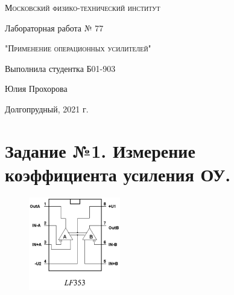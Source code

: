 \documentclass[a4paper]{article}
\begin{document}
\begin{titlepage}
	\centering
	\vspace{5cm}
	{\scshape\LARGE Московский физико-технический институт \par}
	\vspace{5cm}

	{\huge Лабораторная работа № 77 \par}
	\vspace{1cm}
	{\scshape\Large "Применение операционных усилителей"\par}
	\vspace{2cm}
	\vfill
\begin{flushright}
	{\Large Выполнила студентка Б01-903}\par
	\vspace{0.3cm}
	{\LARGE Юлия Прохорова} \par

	
\end{flushright}
	

	\vfill\large

	Долгопрудный, 2021 г.
\end{titlepage}


\pagestyle{fancy} 
\fancyfoot[C]{ \noindent\rule{\textwidth}{0.4pt} \thepage }

\section{Задание №1. Измерение коэффициента усиления ОУ.}


 \begin{figure}[H]
        \begin{center}
        \includegraphics[width=4cm]{lf353.png}
        \label{real} %
        \end{center}
    \end{figure}
\end{document}
